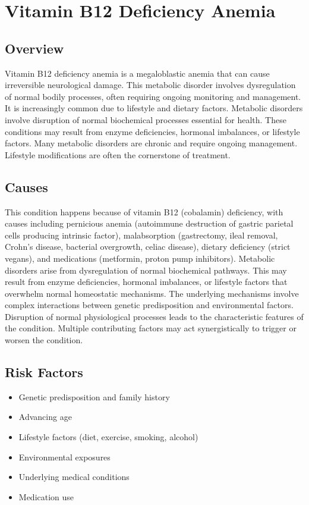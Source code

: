 \chapter{Vitamin B12 Deficiency Anemia}
\label{sec:Vitamin B12 Deficiency Anemia}

\section{Overview}
Vitamin B12 deficiency anemia is a megaloblastic anemia that can cause irreversible neurological damage. This metabolic disorder involves dysregulation of normal bodily processes, often requiring ongoing monitoring and management. It is increasingly common due to lifestyle and dietary factors. Metabolic disorders involve disruption of normal biochemical processes essential for health. These conditions may result from enzyme deficiencies, hormonal imbalances, or lifestyle factors. Many metabolic disorders are chronic and require ongoing management. Lifestyle modifications are often the cornerstone of treatment.
\section{Causes}
This condition happens because of vitamin B12 (cobalamin) deficiency, with causes including pernicious anemia (autoimmune destruction of gastric parietal cells producing intrinsic factor), malabsorption (gastrectomy, ileal removal, Crohn's disease, bacterial overgrowth, celiac disease), dietary deficiency (strict vegans), and medications (metformin, proton pump inhibitors). Metabolic disorders arise from dysregulation of normal biochemical pathways. This may result from enzyme deficiencies, hormonal imbalances, or lifestyle factors that overwhelm normal homeostatic mechanisms. The underlying mechanisms involve complex interactions between genetic predisposition and environmental factors. Disruption of normal physiological processes leads to the characteristic features of the condition. Multiple contributing factors may act synergistically to trigger or worsen the condition.
\section{Risk Factors}
\begin{itemize}[noitemsep]
  \item Genetic predisposition and family history
  \item Advancing age
  \item Lifestyle factors (diet, exercise, smoking, alcohol)
  \item Environmental exposures
  \item Underlying medical conditions
  \item Medication use
\end{itemize}
